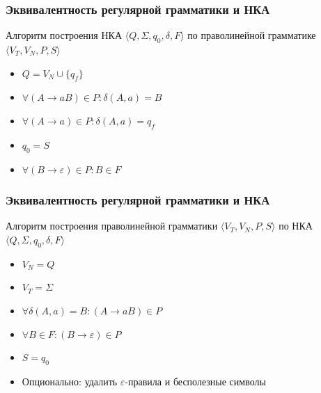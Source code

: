 \documentclass{beamer}
\newenvironment{myauto}[1][3]
{
  \begin{center}
    \begin{tikzpicture}[> = stealth,node distance=#1cm, on grid, very thick]
}
{
    \end{tikzpicture}
  \end{center}
}
\begin{document}
\begin{frame}[fragile]
  \transwipe[direction=90]
  \frametitle{Эквивалентность регулярной грамматики и НКА}
  Алгоритм построения НКА $\langle Q, \Sigma, q_0, \delta, F \rangle$ по праволинейной грамматике $\langle V_T, V_N, P, S \rangle$
  
  \begin{itemize}
    \item $Q = V_N \cup \{q_f\}$
    \item $\forall (A \to a B) \in P: \delta (A, a) = B$
    \item $\forall (A \to a) \in P: \delta (A, a) = q_f$
    \item $q_0 = S$
    \item $\forall (B \to \varepsilon) \in P: B \in F$
  \end{itemize}
\end{frame}



\begin{frame}[fragile]
  \transwipe[direction=90]
  \frametitle{Эквивалентность регулярной грамматики и НКА}
  Алгоритм построения праволинейной грамматики $\langle V_T, V_N, P, S \rangle$ по НКА $\langle Q, \Sigma, q_0, \delta, F \rangle$

  \begin{itemize}
    \item $V_N = Q$
    \item $V_T = \Sigma$
    \item $\forall \delta(A, a) = B : (A \to a B) \in P$
    \item $\forall B \in F: (B \to \varepsilon) \in P$
    \item $S = q_0$
    \item Опционально: удалить $\varepsilon$-правила и бесполезные символы
  \end{itemize}
\end{frame}
\end{document}
